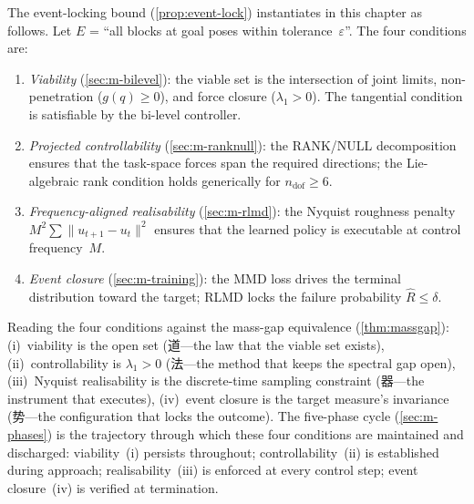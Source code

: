 \begin{remark}
\label{rem:m-event-lock}
The event-locking bound (\cref{prop:event-lock}) instantiates
in this chapter as follows.  Let $E$ = ``all blocks at goal
poses within tolerance~$\varepsilon$''.  The four conditions
are:
\begin{enumerate}[label=(\roman*),nosep]
  \item \emph{Viability} (\cref{sec:m-bilevel}):
  the viable set is the intersection of joint limits,
  non-penetration ($g(q) \geq 0$), and force closure
  ($\lambda_1 > 0$).  The tangential condition is satisfiable
  by the bi-level controller.
  \item \emph{Projected controllability}
  (\cref{sec:m-ranknull}): the RANK/NULL decomposition ensures
  that the task-space forces span the required directions;
  the Lie-algebraic rank condition holds generically for
  $n_{\mathrm{dof}} \geq 6$.
  \item \emph{Frequency-aligned realisability}
  (\cref{sec:m-rlmd}): the Nyquist roughness penalty
  $M^2 \sum \|u_{t+1} - u_t\|^2$ ensures that the learned
  policy is executable at control frequency~$M$.
  \item \emph{Event closure} (\cref{sec:m-training}):
  the MMD loss drives the terminal distribution toward the
  target; RLMD locks the failure probability
  $\hat{R} \leq \delta$.
\end{enumerate}
Reading the four conditions against the mass-gap equivalence
(\cref{thm:massgap}): (i)~viability is the open set
(道---the law that the viable set exists),
(ii)~controllability is $\lambda_1 > 0$
(法---the method that keeps the spectral gap open),
(iii)~Nyquist realisability is the discrete-time sampling
constraint (器---the instrument that executes),
(iv)~event closure is the target measure's invariance
(势---the configuration that locks the outcome).
The five-phase cycle (\cref{sec:m-phases}) is the trajectory
through which these four conditions are maintained and
discharged: viability~(i) persists throughout; controllability~(ii)
is established during approach; realisability~(iii) is enforced at
every control step; event closure~(iv) is verified at termination.
\end{remark}
